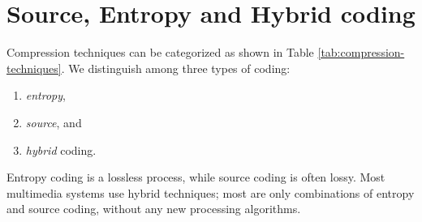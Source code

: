 %	   
%	 



\section{Source, Entropy and Hybrid coding}
Compression techniques can be categorized as shown in Table \ref{tab:compression-techniques}. We distinguish among three types of coding: 
\begin{multicols}{3}
	\begin{enumerate}
		\item \textit{entropy},
		\item \textit{source}, and 
		\item \textit{hybrid} coding. 
	\end{enumerate}
\end{multicols}

Entropy coding is a lossless process, while source coding is often lossy. Most multimedia systems use hybrid techniques; most are only combinations of entropy and source coding, without any new processing algorithms.


